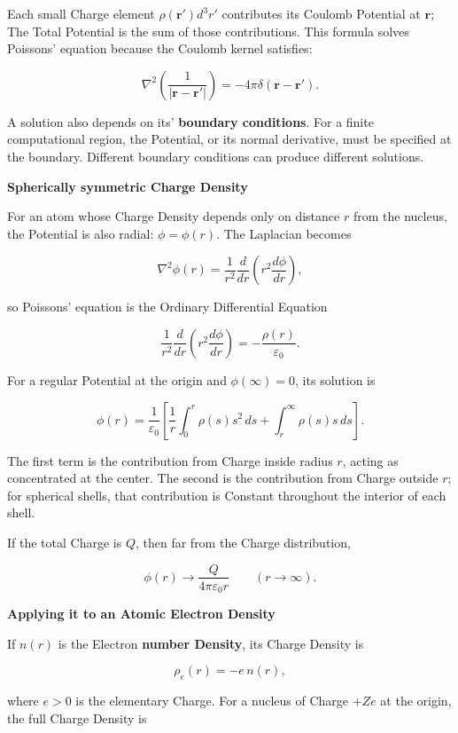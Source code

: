 \documentclass[a4paper, 10pt, onepage]{elegantbook}
\begin{document}
{Each small Charge element \(\rho(\mathbf r')d^3r'\) contributes its Coulomb Potential at \(\mathbf r\);
The Total Potential is the sum of those contributions. This formula solves Poissons' equation because the Coulomb 
kernel satisfies:

\[
\nabla^2\left(\frac{1}{|\mathbf r-\mathbf r'|}\right)
=-4\pi\delta(\mathbf r-\mathbf r').
\]

A solution also depends on its' \textbf{boundary conditions}.
For a finite computational region, the Potential, or its normal derivative, must be specified at the boundary.
Different boundary conditions can produce different solutions.

\textbf{Spherically symmetric Charge Density}

For an atom whose Charge Density depends only on distance \(r\) from the nucleus,
the Potential is also radial: \(\phi=\phi(r)\). The Laplacian becomes

\[
\nabla^2\phi(r)
=
\frac{1}{r^2}\frac{d}{dr}
\left(r^2\frac{d\phi}{dr}\right),
\]

so Poissons' equation is the Ordinary Differential Equation

\[
\frac{1}{r^2}\frac{d}{dr}
\left(r^2\frac{d\phi}{dr}\right)
=
-\frac{\rho(r)}{\varepsilon_0}.
\]

For a regular Potential at the origin and \(\phi(\infty)=0\), its solution is

\[
\phi(r)
=
\frac{1}{\varepsilon_0}
\left[
\frac{1}{r}\int_0^r \rho(s)s^2\,ds
+
\int_r^\infty \rho(s)s\,ds
\right].
\]

The first term is the contribution from Charge inside radius \(r\), acting as concentrated at the center.
The second is the contribution from Charge outside \(r\); for spherical shells,
that contribution is Constant throughout the interior of each shell.

If the total Charge is \(Q\), then far from the Charge distribution,

\[
\phi(r)\longrightarrow \frac{Q}{4\pi\varepsilon_0 r}
\qquad (r\to\infty).
\]

\textbf{Applying it to an Atomic Electron Density}

If \(n(r)\) is the Electron \textbf{number Density}, its Charge Density is

\[
\rho_e(r)=-e\,n(r),
\]

where \(e>0\) is the elementary Charge. For a nucleus of Charge \(+Ze\) at the origin, the full Charge 
Density is

}
\end{document}
